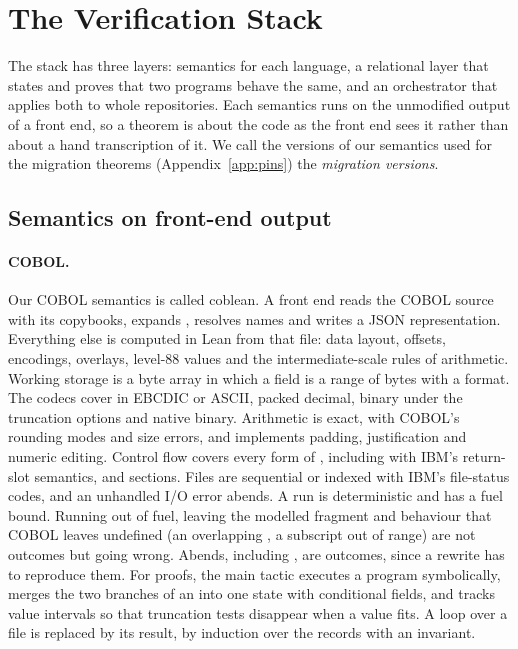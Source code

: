 \section{The Verification Stack}
\label{sec:stack}

The stack has three layers: semantics for each language, a relational layer that states and proves that two programs
behave the same, and an orchestrator that applies both to whole repositories. Each semantics runs on the unmodified
output of a front end, so a theorem is about the code as the front end sees it rather than about a hand transcription of it. We call
the versions of our semantics used for the migration theorems (Appendix~\ref{app:pins}) the \emph{migration versions}.

\subsection{Semantics on front-end output}

\paragraph{COBOL\@.} Our COBOL semantics is called coblean. A front end reads the COBOL source with its copybooks, expands , resolves
names and writes a JSON representation. Everything else is computed in Lean from that file: data layout, offsets,
encodings,  overlays, level-88 values and the intermediate-scale rules of arithmetic. Working storage
is a byte array in which a field is a range of bytes with a format. The codecs cover  in EBCDIC or ASCII,
packed decimal, binary under the truncation options and native binary. Arithmetic is exact, with COBOL's rounding modes
and size errors, and  implements padding, justification and numeric editing. Control flow covers every form
of , including  with IBM's return-slot semantics,  and sections. Files are
sequential or indexed with IBM's file-status codes, and an unhandled I/O error abends. A run is deterministic and has
a fuel bound. Running out of fuel, leaving the modelled fragment and behaviour that COBOL leaves undefined (an
overlapping , a subscript out of range) are not outcomes but going wrong. Abends, including
, are outcomes, since a rewrite has to reproduce them. For proofs, the main tactic executes a program
symbolically, merges the two branches of an  into one state with conditional fields, and tracks value
intervals so that truncation tests disappear when a value fits. A loop over a file is replaced by its result, by
induction over the records with an invariant.

